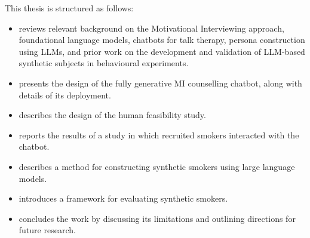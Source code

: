 This thesis is structured as follows:
\begin{itemize}
    \item {} reviews relevant background on the Motivational Interviewing approach, foundational language models, chatbots for talk therapy, persona construction using LLMs, and prior work on the development and validation of LLM-based synthetic subjects in behavioural experiments.
    \item {} presents the design of the fully generative MI counselling chatbot, along with details of its deployment.
    \item {} describes the design of the human feasibility study.
    \item {} reports the results of a study in which recruited smokers interacted with the chatbot.
    \item {} describes a method for constructing synthetic smokers using large language models.
    \item {} introduces a framework for evaluating synthetic smokers.
    \item {} concludes the work by discussing its limitations and outlining directions for future research.
\end{itemize}
